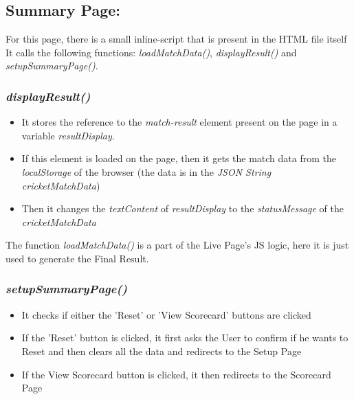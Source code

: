 \documentclass[a4paper,12pt]{article}
\begin{document}
\subsection{Summary Page:}
For this page, there is a small inline-script that is present in the HTML file itself \\
It calls the following functions: \textit{loadMatchData()}, \textit{displayResult()} and \\ \textit{setupSummaryPage()}.
\subsubsection{\textit{displayResult()}}
\begin{itemize}
\item It stores the reference to the \textit{match-result} element present on the page in a variable \textit{resultDisplay}.
\item If this element is loaded on the page, then it gets the match data from the \\ \textit{localStorage} of the browser (the data is in the \textit{JSON String cricketMatchData})
\item Then it changes the \textit{textContent} of \textit{resultDisplay} to the \textit{statusMessage} of the \\ \textit{cricketMatchData}
\end{itemize}

The function \textit{loadMatchData()} is a part of the Live Page's JS logic, here it is just used to generate the Final Result.

\subsubsection{\textit{setupSummaryPage()}}
\begin{itemize}
\item It checks if either the 'Reset' or 'View Scorecard' buttons are clicked
\item If the 'Reset' button is clicked, it first asks the User to confirm if he wants to Reset and then clears all the data and redirects to the Setup Page 
\item If the View Scorecard button is clicked, it then redirects to the Scorecard Page
\end{itemize} 

\clearpage
\end{document}
